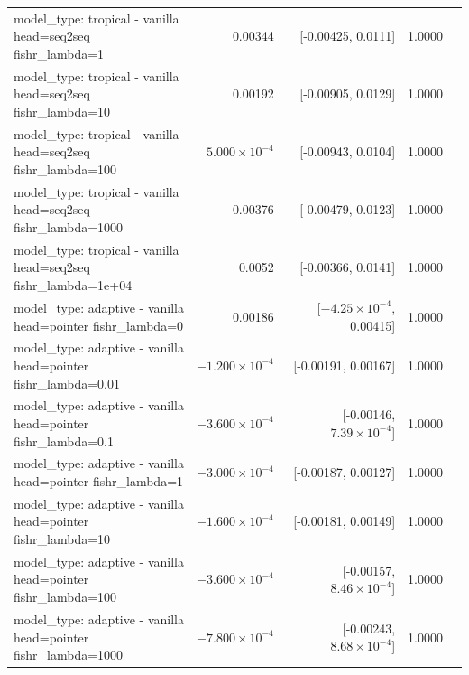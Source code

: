\documentclass[10pt]{article}
\makeatletter
\newcommand{\stackcell}[1]{\begin{tabular}[t]{@{}l@{}}#1\end{tabular}}
\makeatother
\begin{document}
{\begin{longtable}{lrrrl}
\stackcell{model\_type: tropical - vanilla\\\footnotesize head=seq2seq fishr\_lambda=1 } & 0.00344 & [-0.00425, 0.0111] & 1.0000 & \\
\stackcell{model\_type: tropical - vanilla\\\footnotesize head=seq2seq fishr\_lambda=10 } & 0.00192 & [-0.00905, 0.0129] & 1.0000 & \\
\stackcell{model\_type: tropical - vanilla\\\footnotesize head=seq2seq fishr\_lambda=100 } & $5.000\times10^{-4}$ & [-0.00943, 0.0104] & 1.0000 & \\
\stackcell{model\_type: tropical - vanilla\\\footnotesize head=seq2seq fishr\_lambda=1000 } & 0.00376 & [-0.00479, 0.0123] & 1.0000 & \\
\stackcell{model\_type: tropical - vanilla\\\footnotesize head=seq2seq fishr\_lambda=1e+04 } & 0.0052 & [-0.00366, 0.0141] & 1.0000 & \\
\stackcell{model\_type: adaptive - vanilla\\\footnotesize head=pointer fishr\_lambda=0 } & 0.00186 & [$-4.25\times10^{-4}$, 0.00415] & 1.0000 & \\
\stackcell{model\_type: adaptive - vanilla\\\footnotesize head=pointer fishr\_lambda=0.01 } & $-1.200\times10^{-4}$ & [-0.00191, 0.00167] & 1.0000 & \\
\stackcell{model\_type: adaptive - vanilla\\\footnotesize head=pointer fishr\_lambda=0.1 } & $-3.600\times10^{-4}$ & [-0.00146, $7.39\times10^{-4}$] & 1.0000 & \\
\stackcell{model\_type: adaptive - vanilla\\\footnotesize head=pointer fishr\_lambda=1 } & $-3.000\times10^{-4}$ & [-0.00187, 0.00127] & 1.0000 & \\
\stackcell{model\_type: adaptive - vanilla\\\footnotesize head=pointer fishr\_lambda=10 } & $-1.600\times10^{-4}$ & [-0.00181, 0.00149] & 1.0000 & \\
\stackcell{model\_type: adaptive - vanilla\\\footnotesize head=pointer fishr\_lambda=100 } & $-3.600\times10^{-4}$ & [-0.00157, $8.46\times10^{-4}$] & 1.0000 & \\
\stackcell{model\_type: adaptive - vanilla\\\footnotesize head=pointer fishr\_lambda=1000 } & $-7.800\times10^{-4}$ & [-0.00243, $8.68\times10^{-4}$] & 1.0000 & \\

\end{longtable}}
\end{document}
